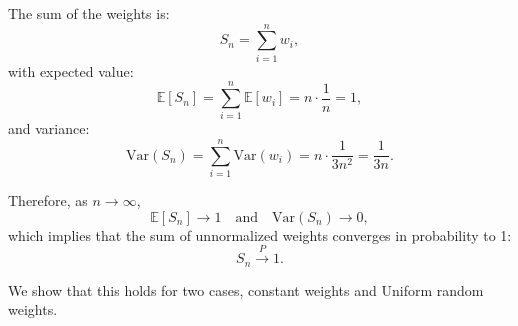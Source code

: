 The sum of the weights is:
\begin{equation}
S_n = \sum_{i=1}^{n} w_i,
\end{equation}
with expected value:
\begin{equation}
\mathbb{E}[S_n] = \sum_{i=1}^{n} \mathbb{E}[w_i] = n \cdot \frac{1}{n} = 1,
\end{equation}
and variance:
\begin{equation}
\text{Var}(S_n) = \sum_{i=1}^{n} \text{Var}(w_i) = n \cdot \frac{1}{3n^2} = \frac{1}{3n}.
\end{equation}

Therefore, as \( n \to \infty \),
\begin{equation}
\mathbb{E}[S_n] \to 1 \quad \text{and} \quad \text{Var}(S_n) \to 0,
\end{equation}
which implies that the sum of unnormalized weights converges in probability to 1:
\begin{equation}
S_n \xrightarrow{P} 1.
\end{equation}

We show that this holds for two cases, constant weights and Uniform random weights. 
